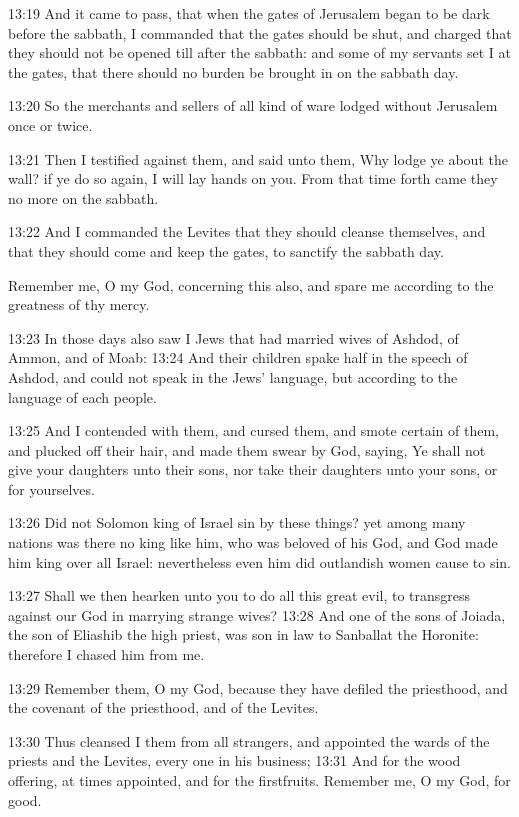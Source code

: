 13:19 And it came to pass, that when the gates of Jerusalem began to
be dark before the sabbath, I commanded that the gates should be shut,
and charged that they should not be opened till after the sabbath: and
some of my servants set I at the gates, that there should no burden be
brought in on the sabbath day.

13:20 So the merchants and sellers of all kind of ware lodged without
Jerusalem once or twice.

13:21 Then I testified against them, and said unto them, Why lodge ye
about the wall? if ye do so again, I will lay hands on you. From that
time forth came they no more on the sabbath.

13:22 And I commanded the Levites that they should cleanse themselves,
and that they should come and keep the gates, to sanctify the sabbath
day.

Remember me, O my God, concerning this also, and spare me according to
the greatness of thy mercy.

13:23 In those days also saw I Jews that had married wives of Ashdod,
of Ammon, and of Moab: 13:24 And their children spake half in the
speech of Ashdod, and could not speak in the Jews' language, but
according to the language of each people.

13:25 And I contended with them, and cursed them, and smote certain of
them, and plucked off their hair, and made them swear by God, saying,
Ye shall not give your daughters unto their sons, nor take their
daughters unto your sons, or for yourselves.

13:26 Did not Solomon king of Israel sin by these things? yet among
many nations was there no king like him, who was beloved of his God,
and God made him king over all Israel: nevertheless even him did
outlandish women cause to sin.

13:27 Shall we then hearken unto you to do all this great evil, to
transgress against our God in marrying strange wives?  13:28 And one
of the sons of Joiada, the son of Eliashib the high priest, was son in
law to Sanballat the Horonite: therefore I chased him from me.

13:29 Remember them, O my God, because they have defiled the
priesthood, and the covenant of the priesthood, and of the Levites.

13:30 Thus cleansed I them from all strangers, and appointed the wards
of the priests and the Levites, every one in his business; 13:31 And
for the wood offering, at times appointed, and for the firstfruits.
Remember me, O my God, for good.

